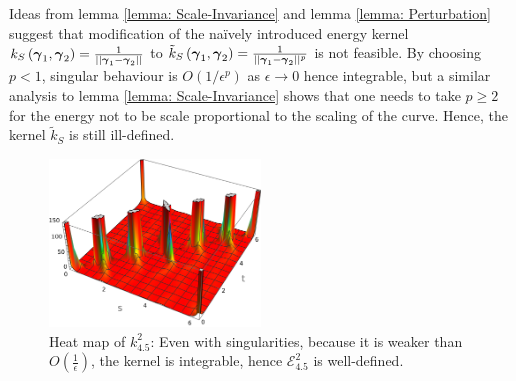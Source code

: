 \documentclass[../dissertation.tex]{subfiles}
\begin{document}
\begin{remark}
    Ideas from lemma \ref{lemma: Scale-Invariance} and lemma \ref{lemma: Perturbation} suggest that modification of the na\"ively introduced energy kernel $k_S \left( \boldsymbol{\gamma}_1, \boldsymbol{\gamma}_2 \right) = \frac{1}{\lvert \lvert \boldsymbol{\gamma}_1 - \boldsymbol{\gamma}_2 \rvert \rvert}$ to $\tilde k_S \left( \boldsymbol{\gamma}_1, \boldsymbol{\gamma}_2 \right) = \frac{1}{\lvert \lvert \boldsymbol{\gamma}_1 - \boldsymbol{\gamma}_2 \rvert \rvert^p}$ is not feasible.
    By choosing $p < 1$, singular behaviour is $O \left( 1/\epsilon^p \right)$ as $\epsilon \rightarrow 0$ hence integrable,
    but a similar analysis to lemma \ref{lemma: Scale-Invariance} shows that
    one needs to take $p \geq 2$ for the energy not to be scale proportional to the scaling of the curve.
    Hence, the kernel $\tilde k_S$ is still ill-defined.
\end{remark}

\begin{figure}[tpb]
    \centering
    \includegraphics[width=0.5\textwidth]{sections/tangentPointEnergyImgs/kHeatMap3}
    \caption{Heat map of $k_{4.5}^{2}$: Even with singularities, because it is weaker than $O \left( \frac{1}{\epsilon} \right)$, the kernel is integrable, hence $\mathcal{E}_{4.5}^{2}$ is well-defined.}
    \label{fig: Low-Order Pole}
\end{figure}
\end{document}

